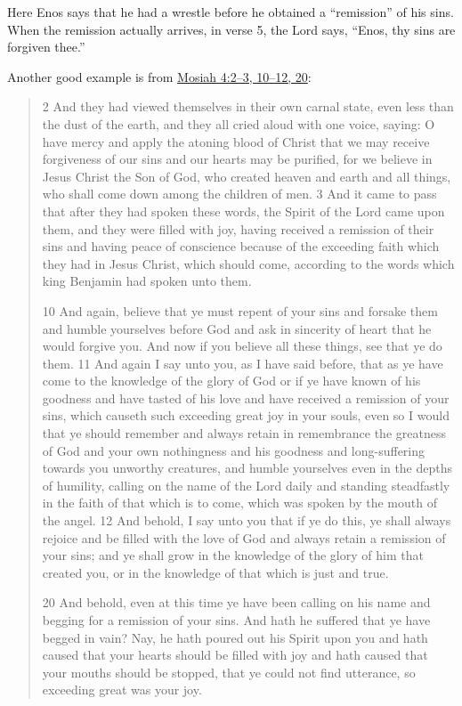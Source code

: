 		Here Enos says that he had a wrestle before he obtained a ``remission'' of his sins. When the remission actually arrives, in verse 5, the Lord says, ``Enos, thy sins are forgiven thee.''
		
		Another good example is from \hyperref[MOSIAH-4-3]{Mosiah 4:2--3, 10--12, 20}:
		
			\begin{quote}
				2 And they had viewed themselves in their own carnal state, even less than the dust of the earth, and they all cried aloud with one voice, saying: O have mercy and apply the atoning blood of Christ that we may receive forgiveness of our sins and our hearts may be purified, for we believe in Jesus Christ the Son of God, who created heaven and earth and all things, who shall come down among the children of men. 3 And it came to pass that after they had spoken these words, the Spirit of the Lord came upon them, and they were filled with joy, having received a remission of their sins and having peace of conscience because of the exceeding faith which they had in Jesus Christ, which should come, according to the words which king Benjamin had spoken unto them.
				
				10 And again, believe that ye must repent of your sins and forsake them and humble yourselves before God and ask in sincerity of heart that he would forgive you. And now if you believe all these things, see that ye do them. 11 And again I say unto you, as I have said before, that as ye have come to the knowledge of the glory of God or if ye have known of his goodness and have tasted of his love and have received a remission of your sins, which causeth such exceeding great joy in your souls, even so I would that ye should remember and always retain in remembrance the greatness of God and your own nothingness and his goodness and long-suffering towards you unworthy creatures, and humble yourselves even in the depths of humility, calling on the name of the Lord daily and standing steadfastly in the faith of that which is to come, which was spoken by the mouth of the angel. 12 And behold, I say unto you that if ye do this, ye shall always rejoice and be filled with the love of God and always retain a remission of your sins; and ye shall grow in the knowledge of the glory of him that created you, or in the knowledge of that which is just and true. 
				
				20 And behold, even at this time ye have been calling on his name and begging for a remission of your sins. And hath he suffered that ye have begged in vain? Nay, he hath poured out his Spirit upon you and hath caused that your hearts should be filled with joy and hath caused that your mouths should be stopped, that ye could not find utterance, so exceeding great was your joy. 
			\end{quote}
			

